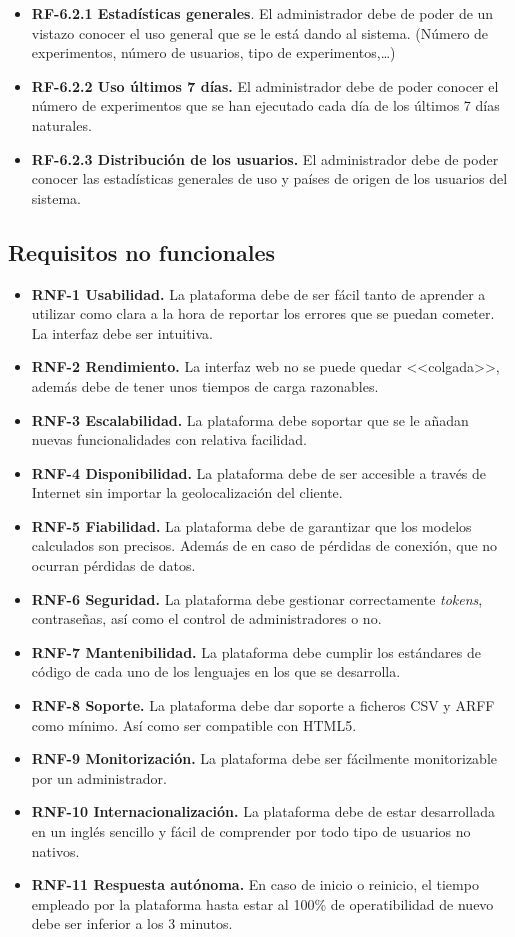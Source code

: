 \begin{itemize}
\begin{itemize}
\begin{itemize}
		\item \textbf{RF-6.2.1 Estadísticas generales}. El administrador debe de poder de un vistazo conocer el uso general que se le está dando al sistema. (Número de experimentos, número de usuarios, tipo de experimentos,\dots)
		\item \textbf{RF-6.2.2 Uso últimos 7 días.} El administrador debe de poder conocer el número de experimentos que se han ejecutado cada día de los últimos 7 días naturales.
		\item \textbf{RF-6.2.3 Distribución de los usuarios.} El administrador debe de poder conocer las estadísticas generales de uso y países de origen de los usuarios del sistema.
	\end{itemize}
	\end{itemize}
\end{itemize}
\pagebreak
\subsection{Requisitos no funcionales}\label{requisitos-no-funcionales}
\begin{itemize}
\item \textbf{RNF-1 Usabilidad.} La plataforma debe de ser fácil tanto de aprender a utilizar como clara a la hora de reportar los errores que se puedan cometer. La interfaz debe ser intuitiva.
\item \textbf{RNF-2 Rendimiento.} La interfaz web no se puede quedar <<colgada>>, además debe de tener unos tiempos de carga razonables.
\item \textbf{RNF-3 Escalabilidad.} La plataforma debe soportar que se le añadan nuevas funcionalidades con relativa facilidad.
\item \textbf{RNF-4 Disponibilidad.} La plataforma debe de ser accesible a través de Internet sin importar la geolocalización del cliente.
\item \textbf{RNF-5 Fiabilidad.} La plataforma debe de garantizar que los modelos calculados son precisos. Además de en caso de pérdidas de conexión, que no ocurran pérdidas de datos.
\item \textbf{RNF-6 Seguridad.} La plataforma debe gestionar correctamente \textit{tokens}, contraseñas, así como el control de administradores o no.
\item \textbf{RNF-7 Mantenibilidad.} La plataforma debe cumplir los estándares de código de cada uno de los lenguajes en los que se desarrolla. 
\item \textbf{RNF-8 Soporte.} La plataforma debe dar soporte a ficheros CSV y ARFF como mínimo. Así como ser compatible con HTML5.
\item \textbf{RNF-9 Monitorización.} La plataforma debe ser fácilmente monitorizable por un administrador.
\item \textbf{RNF-10 Internacionalización.} La plataforma debe de estar desarrollada en un inglés sencillo y fácil de comprender por todo tipo de usuarios no nativos.
\item \textbf{RNF-11 Respuesta autónoma.} En caso de inicio o reinicio, el tiempo empleado por la plataforma hasta estar al 100\% de operatibilidad de nuevo debe ser inferior a los 3 minutos.
\end{itemize}
\newpage
